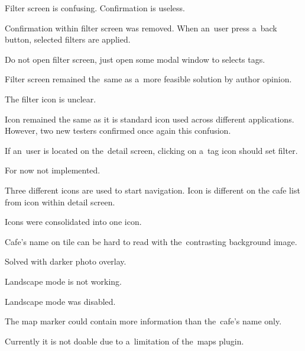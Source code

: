 \begin{questions}
  \item Filter screen is confusing. Confirmation is useless.
         \begin{answer}
          Confirmation within filter screen was removed. When an~user press a~back button, selected filters are applied.
         \end{answer}
    \item Do not open filter screen, just open some modal window to selects tags.
         \begin{answer}
          Filter screen remained the~same as a~more feasible solution by author opinion.
         \end{answer}
    \item The filter icon is unclear.
         \begin{answer}
          Icon remained the same as it is standard icon used across different applications. However, two new testers confirmed once again this confusion. 
         \end{answer}
    \item If an~user is located on the~detail screen, clicking on a~tag icon should set filter.
         \begin{answer}
         For now not implemented. 
         \end{answer}
   \item Three different icons are used to start navigation. Icon is different on the cafe list from icon within detail screen.
         \begin{answer}
          Icons were consolidated into one icon.
         \end{answer}
   \item Cafe's name on tile can be hard to read with the~contrasting background image.
         \begin{answer}
          Solved with darker photo overlay.
         \end{answer}
   \item Landscape mode is not working.
         \begin{answer}
          Landscape mode was disabled. 
         \end{answer}
   \item The map marker could contain more information than the~cafe's name only.
         \begin{answer}
          Currently it is not doable due to a~limitation of the~maps plugin.
         \end{answer}
\end{questions}

